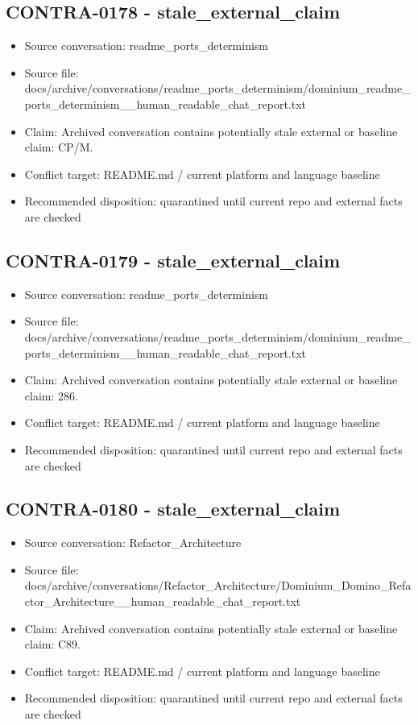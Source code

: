 \documentclass[11pt,a4paper]{report}
\begin{document}
\subsection{CONTRA-0178 - stale\_external\_claim}

\begin{itemize}
\item Source conversation: readme\_ports\_determinism
\item Source file: docs/archive/conversations/readme\_ports\_determinism/dominium\_readme\_ports\_determinism\_\_human\_readable\_chat\_report.txt
\item Claim: Archived conversation contains potentially stale external or baseline claim: CP/M.
\item Conflict target: README.md / current platform and language baseline
\item Recommended disposition: quarantined until current repo and external facts are checked
\end{itemize}

\subsection{CONTRA-0179 - stale\_external\_claim}

\begin{itemize}
\item Source conversation: readme\_ports\_determinism
\item Source file: docs/archive/conversations/readme\_ports\_determinism/dominium\_readme\_ports\_determinism\_\_human\_readable\_chat\_report.txt
\item Claim: Archived conversation contains potentially stale external or baseline claim: 286.
\item Conflict target: README.md / current platform and language baseline
\item Recommended disposition: quarantined until current repo and external facts are checked
\end{itemize}

\subsection{CONTRA-0180 - stale\_external\_claim}

\begin{itemize}
\item Source conversation: Refactor\_Architecture
\item Source file: docs/archive/conversations/Refactor\_Architecture/Dominium\_Domino\_Refactor\_Architecture\_\_human\_readable\_chat\_report.txt
\item Claim: Archived conversation contains potentially stale external or baseline claim: C89.
\item Conflict target: README.md / current platform and language baseline
\item Recommended disposition: quarantined until current repo and external facts are checked
\end{itemize}
\end{document}
